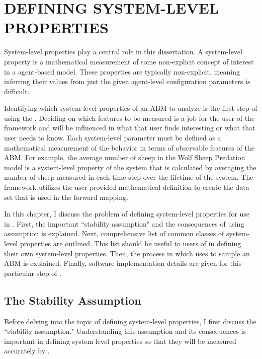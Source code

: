\chapter{DEFINING SYSTEM-LEVEL PROPERTIES}
\thispagestyle{plain}

\label{Defining}

System-level properties play a central role in this dissertation.
A system-level property is a mathematical measurement of some non-explicit concept of interest in a agent-based model.
These properties are typically non-explicit, meaning inferring their values from just the given agent-level configuration parameters is difficult.

Identifying which system-level properties of an ABM to analyze is the first step of using the \framework.
Deciding on which features to be measured is a job for the user of the framework and will be influenced in what that user finds interesting or what that user needs to know.
Each system-level parameter must be defined as a mathematical measurement of the behavior in terms of observable features of the ABM.
For example, the average number of sheep in the Wolf Sheep Predation model is a system-level property of the system that is calculated by averaging the number of sheep measured in each time step over the lifetime of the system.
The framework utilizes the user provided mathematical definition to create the data set that is used in the forward mapping.

In this chapter, I discuss the problem of defining system-level properties for use in \fw.
First, the important ``stability assumption" and the consequences of using assumption is explained.
Next, comprehensive list of common classes of system-level properties are outlined.
This list should be useful to users of \fw in defining their own system-level properties.
Then, the process in which \fw uses to sample an ABM is explained.
Finally, software implementation details are given for this particular step of \fw.


\section{The Stability Assumption}

Before delving into the topic of defining system-level properties, I first discuss the ``stability assumption."
Understanding this assumption and its consequences is important in defining system-level properties so that they will be measured accurately by \fw.


